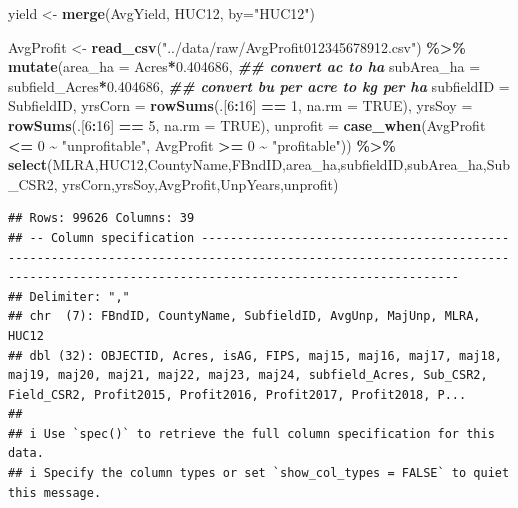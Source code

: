 \documentclass[
]{article}
\newenvironment{Shaded}{\begin{snugshade}}{\end{snugshade}}
\newcommand{\AttributeTok}[1]{\textcolor[rgb]{0.13,0.29,0.53}{#1}}
\newcommand{\ConstantTok}[1]{\textcolor[rgb]{0.56,0.35,0.01}{#1}}
\newcommand{\DecValTok}[1]{\textcolor[rgb]{0.00,0.00,0.81}{#1}}
\newcommand{\DocumentationTok}[1]{\textcolor[rgb]{0.56,0.35,0.01}{\textbf{\textit{#1}}}}
\newcommand{\FloatTok}[1]{\textcolor[rgb]{0.00,0.00,0.81}{#1}}
\newcommand{\FunctionTok}[1]{\textcolor[rgb]{0.13,0.29,0.53}{\textbf{#1}}}
\newcommand{\NormalTok}[1]{#1}
\newcommand{\OtherTok}[1]{\textcolor[rgb]{0.56,0.35,0.01}{#1}}
\newcommand{\SpecialCharTok}[1]{\textcolor[rgb]{0.81,0.36,0.00}{\textbf{#1}}}
\newcommand{\StringTok}[1]{\textcolor[rgb]{0.31,0.60,0.02}{#1}}
\begin{document}
\begin{Shaded}
\begin{Highlighting}[]
\NormalTok{yield }\OtherTok{\textless{}{-}} \FunctionTok{merge}\NormalTok{(AvgYield, HUC12, }\AttributeTok{by=}\StringTok{"HUC12"}\NormalTok{)}

\NormalTok{AvgProfit }\OtherTok{\textless{}{-}} \FunctionTok{read\_csv}\NormalTok{(}\StringTok{"../data/raw/AvgProfit012345678912.csv"}\NormalTok{) }\SpecialCharTok{\%\textgreater{}\%}
  \FunctionTok{mutate}\NormalTok{(}\AttributeTok{area\_ha =}\NormalTok{ Acres}\SpecialCharTok{*}\FloatTok{0.404686}\NormalTok{, }\DocumentationTok{\#\# convert ac to ha}
         \AttributeTok{subArea\_ha =}\NormalTok{ subfield\_Acres}\SpecialCharTok{*}\FloatTok{0.404686}\NormalTok{, }\DocumentationTok{\#\# convert bu per acre to kg per ha}
         \AttributeTok{subfieldID =}\NormalTok{ SubfieldID,}
         \AttributeTok{yrsCorn =} \FunctionTok{rowSums}\NormalTok{(.[}\DecValTok{6}\SpecialCharTok{:}\DecValTok{16}\NormalTok{] }\SpecialCharTok{==} \DecValTok{1}\NormalTok{, }\AttributeTok{na.rm =} \ConstantTok{TRUE}\NormalTok{),}
         \AttributeTok{yrsSoy =} \FunctionTok{rowSums}\NormalTok{(.[}\DecValTok{6}\SpecialCharTok{:}\DecValTok{16}\NormalTok{] }\SpecialCharTok{==} \DecValTok{5}\NormalTok{, }\AttributeTok{na.rm =} \ConstantTok{TRUE}\NormalTok{),}
         \AttributeTok{unprofit =} \FunctionTok{case\_when}\NormalTok{(AvgProfit }\SpecialCharTok{\textless{}=} \DecValTok{0} \SpecialCharTok{\textasciitilde{}} \StringTok{"unprofitable"}\NormalTok{,}
\NormalTok{                              AvgProfit }\SpecialCharTok{\textgreater{}=} \DecValTok{0} \SpecialCharTok{\textasciitilde{}} \StringTok{"profitable"}\NormalTok{)) }\SpecialCharTok{\%\textgreater{}\%}
  \FunctionTok{select}\NormalTok{(MLRA,HUC12,CountyName,FBndID,area\_ha,subfieldID,subArea\_ha,Sub\_CSR2,}
\NormalTok{         yrsCorn,yrsSoy,AvgProfit,UnpYears,unprofit)}
\end{Highlighting}
\end{Shaded}

\begin{verbatim}
## Rows: 99626 Columns: 39
## -- Column specification --------------------------------------------------------------------------------------------------------------------------------------------------------------------------------
## Delimiter: ","
## chr  (7): FBndID, CountyName, SubfieldID, AvgUnp, MajUnp, MLRA, HUC12
## dbl (32): OBJECTID, Acres, isAG, FIPS, maj15, maj16, maj17, maj18, maj19, maj20, maj21, maj22, maj23, maj24, subfield_Acres, Sub_CSR2, Field_CSR2, Profit2015, Profit2016, Profit2017, Profit2018, P...
## 
## i Use `spec()` to retrieve the full column specification for this data.
## i Specify the column types or set `show_col_types = FALSE` to quiet this message.
\end{verbatim}
\end{document}
